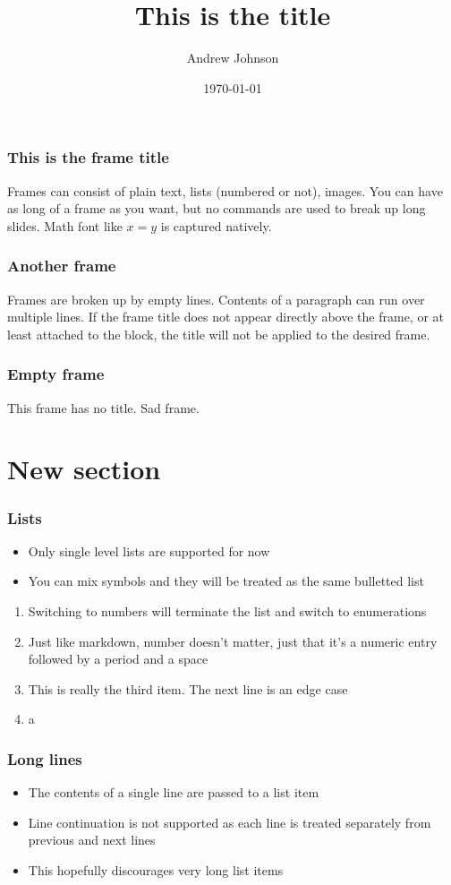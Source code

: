 \documentclass{beamer}
\author{Andrew Johnson}
\date{\today}
\title{This is the title}
\begin{document}
\frame{\titlepage}
\frame{\tableofcontents}

\begin{frame}
\frametitle{This is the frame title}
Frames can consist of plain text, lists (numbered or not), images.
You can have as long of a frame as you want, but no commands
are used to break up long slides.
Math font like $x=y$ is captured natively.
\end{frame}

\begin{frame}
\frametitle{Another frame}
Frames are broken up by empty lines. Contents of a paragraph
can run over multiple lines. If the frame title does not
appear directly above the frame, or at least attached to the block,
the title will not be applied to the desired frame.
\end{frame}

\begin{frame}
\frametitle{Empty frame}
\end{frame}

\begin{frame}
This frame has no title.
Sad frame.
\end{frame}

\section{New section}
\frame{\sectionpage}

\begin{frame}
\frametitle{Lists}
\begin{itemize}
\item{Only single level lists are supported for now}
\item{You can mix symbols and they will be treated as the same bulletted list}
\end{itemize}
\begin{enumerate}
\item{Switching to numbers will terminate the list and switch to enumerations}
\item{Just like markdown, number doesn't matter, just that it's a numeric entry followed by a period and a space}
\item{This is really the third item. The next line is an edge case}
\item{a}
\end{enumerate}
\end{frame}

\begin{frame}
\frametitle{Long lines}
\begin{itemize}
\item{The contents of a single line are passed to a list item}
\item{Line continuation is not supported as each line is treated separately from previous and next lines}
\item{This hopefully discourages very long list items}
\end{itemize}
\end{frame}
\end{document}
